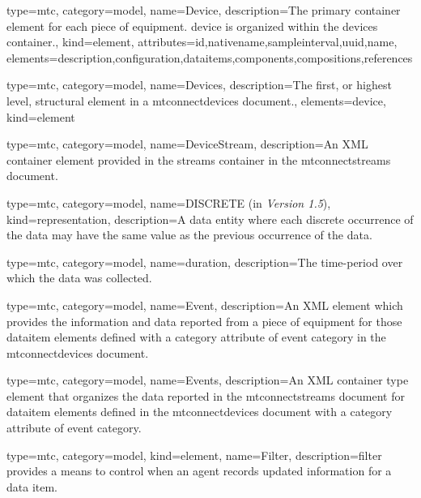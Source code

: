 {
  type=mtc,
  category=model,
  name={Device},
  description={The primary container element for each piece of equipment. \gls{device} is organized within the \gls{devices}  container.},
  kind={element},
  attributes={\gls{id},\gls{nativename},\gls{sampleinterval},\gls{uuid},\gls{name}},
  elements={\gls{description},\gls{configuration},\gls{dataitems},\gls{components},\glspl{composition},\glspl{reference}}
}

{
  type=mtc,
  category=model,
  name={Devices},
  description={The first, or highest level, \gls{structural element} in a \gls{mtconnectdevices} document.},
  elements={\gls{device}},
  kind={element}
}


{
  type=mtc,
  category=model,
  name={DeviceStream},
  description={An XML container element provided in the \gls{streams} container in the \gls{mtconnectstreams} document.}
}



{
  type=mtc,
  category=model,
  name={DISCRETE (\normalfont \DEPRECATED in \textit{Version 1.5})},
  kind={representation},
  description={A \gls{data entity} where each discrete occurrence of the data may have the same value as the previous occurrence of the data.}
}

{
  type=mtc,
  category=model,
  name={duration},
  description={The time-period over which the data was collected.}
}



{
  type=mtc,
  category=model,
  name={Event},
  description={An XML element which provides the information and data reported from a piece of equipment for those \gls{dataitem} elements defined with a \gls{category} attribute of \gls{event category} in the \gls{mtconnectdevices} document.}
}


{
  type=mtc,
  category=model,
  name={Events},
  description={An XML container type element that organizes the data reported in the \gls{mtconnectstreams} document for \gls{dataitem} elements defined in the \gls{mtconnectdevices} document with a \gls{category} attribute of \gls{event category}.}
}


{
  type=mtc,
  category=model,
  kind={element},
  name={Filter},
  description={\gls{filter} provides a means to control when an \gls{agent} records updated information for a data item.}
}

